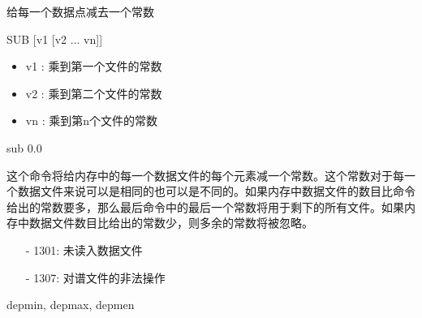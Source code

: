 \label{cmd:sub}

给每一个数据点减去一个常数

\begin{SACSTX}
SUB  [v1 [v2 ... vn]]
\end{SACSTX}

\begin{itemize}
\item v1 :  乘到第一个文件的常数 
\item v2 :  乘到第二个文件的常数 
\item vn :  乘到第n个文件的常数 
\end{itemize}

\begin{SACDFT}
sub 0.0
\end{SACDFT}

这个命令将给内存中的每一个数据文件的每个元素减一个常数。这个常数对于每一个数据文件来说可以是相同的也可以是不同的。如果内存中数据文件的数目比命令给出的常数要多，那么最后命令中的最后一个常数将用于剩下的所有文件。如果内存中数据文件数目比给出的常数少，则多余的常数将被忽略。

\begin{itemize}
\item[-]1301: 未读入数据文件
\item[-]1307: 对谱文件的非法操作
\end{itemize}

depmin, depmax, depmen
